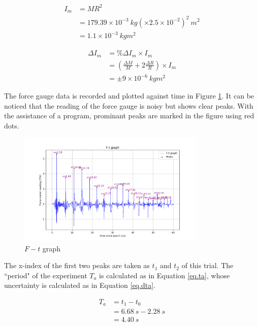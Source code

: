 \documentclass[a4paper]{article}
\begin{document}
\begin{equation}
    \begin{aligned}
        I_m &= MR^2 \\
            &= 179.39 \times 10^{-3} \SI{}{kg} (\times 2.5 \times 10^{-2})^2 \SI{}{m^2}\\
            &= 1.1\times 10^{-3}\SI{}{kgm^2}
    \end{aligned}
\end{equation}%

\begin{equation}
    \begin{aligned}
        \Delta I_m &= \%\Delta I_m \times I_m \\
            &= (\frac{\Delta M}{M} + 2\frac{\Delta R}{R})\times I_m\\
            &= \pm 9\times 10^{-6}\SI{}{kgm^2}
    \end{aligned} %
\end{equation}

The force gauge data is recorded and plotted against time in Figure \ref{fig.ft}. It can be noticed that the reading of the force gauge is noisy but shows clear peaks. With the assistance of a program, prominant peaks are marked in the figure using red dots.

\begin{figure}
    \centering
    \includegraphics[width = 0.8\textwidth]{graphft.png}
    \caption{$F - t$ graph}
    \label{fig.ft}
\end{figure}

The x-index of the first two peaks are taken as $t_1$ and $t_2$ of this trial. The ``period" of the experiment $T_a$ is calculated as in Equation \ref{eq.ta}, whose uncertainty is calculated as in Equation \ref{eq.dta}.

\begin{equation}
    \begin{aligned}
        T_a &= t_1 - t_0 \\
            &= \SI{6.68}{s} -  \SI{2.28}{s}\\
            &= \SI{4.40}{s}
    \end{aligned}
    \label{eq.ta}
\end{equation}
\end{document}
